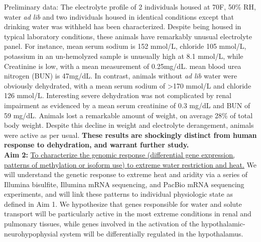 %
%


Preliminary data: The electrolyte profile of 2 individuals housed at 70F, 50\% RH, water \textit{ad lib} and two individuals housed in identical conditions except that drinking water was withheld has been characterized. Despite being housed in typical laboratory conditions, these animals have remarkably unusual electrolyte panel. For instance, mean serum sodium is 152 mmol/L, chloride 105 mmol/L, potassium in an un-hemolyzed sample is unusually high at 8.1 mmol/L, while Creatinine is low, with a mean measurement of 0.25mg/dL. mean blood urea nitrogen (BUN) is 47mg/dL. In contrast, animals without \textit{ad lib} water were obviously dehydrated, with a mean serum sodium of \textgreater 170 mmol/L and chloride 126 mmol/L. Interesting severe dehydration was not complicated by renal impairment as evidenced by a mean serum creatinine of 0.3 mg/dL and BUN of 59 mg/dL. Animals lost a remarkable amount of weight, on average 28\% of total body weight. Despite this decline in weight and electrolyte derangement, animals were active as per usual. \textbf{These results are shockingly distinct from human response to dehydration, and warrant further study.}  \\  


\noindent \textbf{Aim 2:} \ul{To characterize the genomic response (differential gene expression, patterns of methylation or isoform use) to extreme water restriction and heat.} {We will understand the genetic response to extreme heat and aridity via a series of Illumina bisulfite, Illumina mRNA sequencing, and PacBio mRNA sequencing experiments, and will link these patterns to individual physiologic state as defined in Aim 1.} We hypothesize that genes responsible for water and solute transport will be particularly active in the most extreme conditions in renal and pulmonary tissues, while genes involved in the activation of the hypothalamic-neurohypophysial system will be differentially regulated in the hypothalamus.\\

